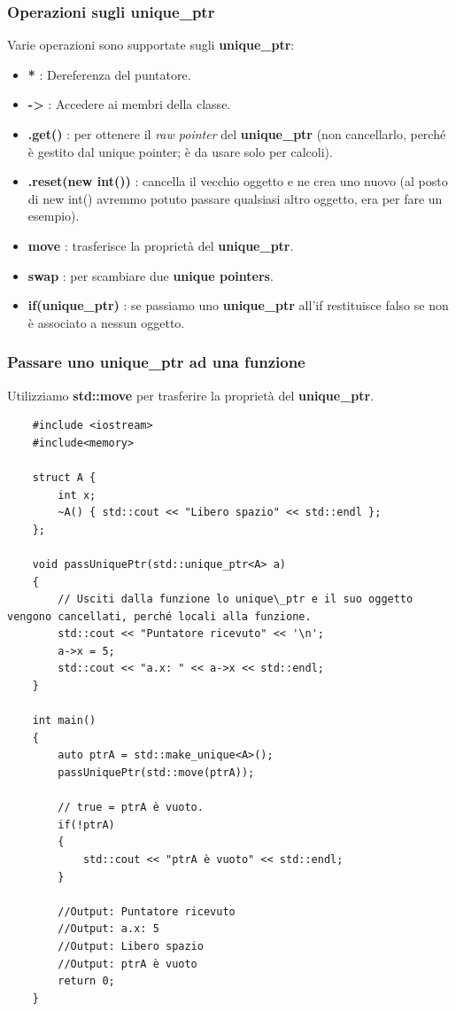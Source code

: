 \subsubsection{Operazioni sugli unique\_ptr}

\textsf{\small Varie operazioni sono supportate sugli \textbf{unique\_ptr}: } \\

\begin{itemize}
	\item \textsf{\small \textbf{*} : Dereferenza del puntatore.}
	\item \textsf{\small \textbf{->} : Accedere ai membri della classe.}
	\item \textsf{\small \textbf{.get()} : per ottenere il \emph{raw pointer} del \textbf{unique\_ptr} (non cancellarlo, perché è gestito dal unique pointer; è da usare solo per calcoli).}
	\item \textsf{\small \textbf{.reset(new int())} : cancella il vecchio oggetto e ne crea uno nuovo (al posto di new int() avremmo potuto passare qualsiasi altro oggetto, era per fare un esempio).}
	\item \textsf{\small \textbf{move} : trasferisce la proprietà del \textbf{unique\_ptr}.}
	\item \textsf{\small \textbf{swap} : per scambiare due \textbf{unique pointers}.}
	\item \textsf{\small \textbf{if(unique\_ptr)} : se passiamo uno \textbf{unique\_ptr} all'if restituisce falso se non è associato a nessun oggetto.}
\end{itemize}

\subsubsection{Passare uno unique\_ptr ad una funzione}

\textsf{\small Utilizziamo \textbf{std::move} per trasferire la proprietà del \textbf{unique\_ptr}.} \\

\begin{lstlisting}
	#include <iostream>
	#include<memory>
	
	struct A {
		int x;
		~A() { std::cout << "Libero spazio" << std::endl };
	};

	void passUniquePtr(std::unique_ptr<A> a)
	{
		// Usciti dalla funzione lo unique\_ptr e il suo oggetto vengono cancellati, perché locali alla funzione.
		std::cout << "Puntatore ricevuto" << '\n';
		a->x = 5;
		std::cout << "a.x: " << a->x << std::endl;
	}

	int main()
	{
		auto ptrA = std::make_unique<A>();
		passUniquePtr(std::move(ptrA));
		
		// true = ptrA è vuoto.
		if(!ptrA)
		{
			std::cout << "ptrA è vuoto" << std::endl;
		}
	
		//Output: Puntatore ricevuto
		//Output: a.x: 5
		//Output: Libero spazio
		//Output: ptrA è vuoto
		return 0;
	}
\end{lstlisting} 

